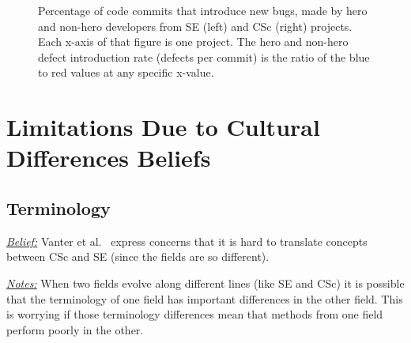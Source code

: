 \documentclass[conference,10pt]{IEEEtran}
\begin{document}
\begin{figure}[!t]
\vspace{-5pt}
\vspace{-13pt}
\caption{Percentage of code commits that introduce new bugs, made by hero and non-hero developers from SE (left) and CSc (right) projects.
Each x-axis of that figure is one project. The hero and non-hero defect introduction rate (defects per commit) is the ratio of the blue to red values
at any specific x-value.
}\label{fig:heroes}
\vspace{-7pt}
\end{figure}

\section{Limitations Due to Cultural Differences Beliefs}

\subsection{Terminology}\label{terms}
\noindent \textit{\underline{Belief:}} 
Vanter et al.~\cite{faulk09_secs, easterbrook_cs, boyle09_lessons} express concerns
that it is hard to translate concepts between  CSc and SE (since the fields are so different). 

\noindent \textit{\underline{Notes:}} When two fields evolve along different
lines (like SE and CSc) it is possible that the terminology of one field has important
differences in the other field. This is worrying if those terminology differences mean that methods from one field perform poorly in the other.
\end{document}
